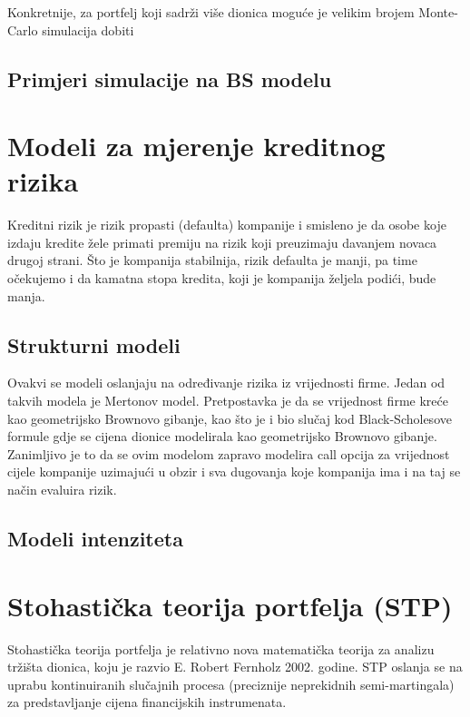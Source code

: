 \documentclass[times, utf8, seminar]{fer}
\begin{document}

Konkretnije, za portfelj koji sadrži više dionica moguće je velikim brojem Monte-Carlo simulacija dobiti

\section{Primjeri simulacije na BS modelu}

\chapter{Modeli za mjerenje kreditnog rizika}
Kreditni rizik je rizik propasti (defaulta) kompanije i smisleno je da osobe koje izdaju kredite žele primati premiju na rizik koji preuzimaju davanjem novaca drugoj strani. Što je kompanija stabilnija, rizik defaulta je manji, pa time očekujemo i da kamatna stopa kredita, koji je kompanija željela podići, bude manja.

\section{Strukturni modeli}
Ovakvi se modeli oslanjaju na određivanje rizika iz vrijednosti firme. Jedan od takvih modela je Mertonov model. Pretpostavka je da se vrijednost firme kreće kao geometrijsko Brownovo gibanje, kao što je i bio slučaj kod Black-Scholesove formule gdje se cijena dionice modelirala kao geometrijsko Brownovo gibanje.
Zanimljivo je to da se ovim modelom zapravo modelira call opcija za vrijednost cijele kompanije uzimajući u obzir i sva dugovanja koje kompanija ima i na taj se način evaluira rizik.


\section{Modeli intenziteta}


\chapter{Stohastička teorija portfelja (STP)}
Stohastička teorija portfelja je relativno nova matematička teorija za analizu tržišta dionica, koju je razvio E. Robert Fernholz 2002. godine. STP oslanja se na uprabu kontinuiranih slučajnih procesa (preciznije neprekidnih semi-martingala) za predstavljanje cijena financijskih instrumenata.
\end{document}
